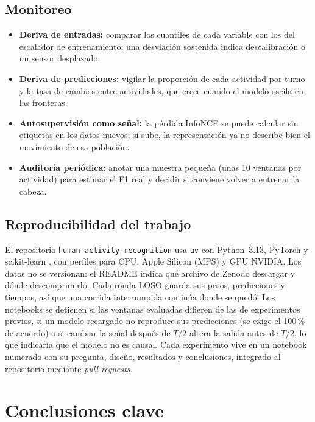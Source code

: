 \documentclass[letterpaper,11pt]{article}
\begin{document}
\subsection{Monitoreo}
\begin{itemize}
  \item \textbf{Deriva de entradas:} comparar los cuantiles de cada variable con los del escalador de entrenamiento; una desviación sostenida indica descalibración o un sensor desplazado.
  \item \textbf{Deriva de predicciones:} vigilar la proporción de cada actividad por turno y la tasa de cambios entre actividades, que crece cuando el modelo oscila en las fronteras.
  \item \textbf{Autosupervisión como señal:} la pérdida InfoNCE se puede calcular sin etiquetas en los datos nuevos; si sube, la representación ya no describe bien el movimiento de esa población.
  \item \textbf{Auditoría periódica:} anotar una muestra pequeña (unas 10 ventanas por actividad) para estimar el F1 real y decidir si conviene volver a entrenar la cabeza.
\end{itemize}

\subsection{Reproducibilidad del trabajo}
El repositorio \texttt{human-activity-recognition} usa \texttt{uv} con Python~3.13, PyTorch \parencite{paszke2019} y scikit-learn \parencite{pedregosa2011}, con perfiles para CPU, Apple Silicon (MPS) y GPU NVIDIA. Los datos no se versionan: el README indica qué archivo de Zenodo descargar y dónde descomprimirlo. Cada ronda LOSO guarda sus pesos, predicciones y tiempos, así que una corrida interrumpida continúa donde se quedó. Los notebooks se detienen si las ventanas evaluadas difieren de las de experimentos previos, si un modelo recargado no reproduce sus predicciones (se exige el 100\,\% de acuerdo) o si cambiar la señal después de $T/2$ altera la salida antes de $T/2$, lo que indicaría que el modelo no es causal. Cada experimento vive en un notebook numerado con su pregunta, diseño, resultados y conclusiones, integrado al repositorio mediante \emph{pull requests}.

\section{Conclusiones clave}
\end{document}
